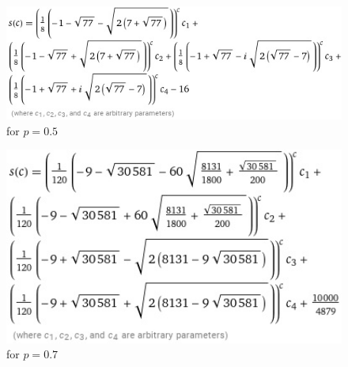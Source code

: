 \documentclass[]{book}
\theoremstyle{definition}
\begin{document}
\begin{figure}[H]
    \centering
    \includegraphics[width=1\textwidth]{figures/equation_3.jpg}
    \caption{for $p=0.5$}
\end{figure}
\begin{figure}[H]
    \centering
    \includegraphics[width=1\textwidth]{figures/equation_4.jpg}
    \caption{for $p=0.7$}
\end{figure}
\end{document}
